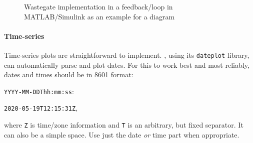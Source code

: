 \begin{figure}[tbp]
    \caption[Wastegate feedback loop]{%
        Wastegate implementation in a feedback\-/loop in MATLAB/Simulink
        as an example for a  diagram%
    }
    \label{fig:tikz_control_diagram}
\end{figure}


\paragraph{Time-series}
Time-series plots are straightforward to implement.
, using its \texttt{dateplot} library, can automatically parse
and plot dates.
For this to work best and most reliably, dates and times should be in
 8601 format:
\begin{center}
    \texttt{YYYY-MM-DDThh:mm:ss\phantom{Z}}:%
    
    \texttt{2020-05-19T12:15:31Z},
\end{center}
where \texttt{Z} is time\-/zone information and \texttt{T} is an arbitrary, but
fixed separator.
It can also be a simple space.
Use just the date \emph{or} time part when appropriate.

